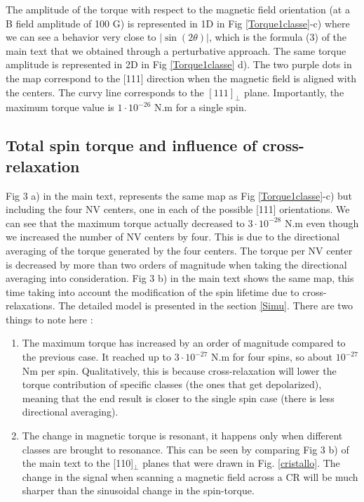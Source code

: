 \documentclass[preprintnumbers,amsmath,amssymb,onecolumn,12pt]{revtex4}
\begin{document}
The amplitude of the torque with respect to the magnetic field orientation (at a B field amplitude of 100 G) is represented in 1D in Fig \ref{Torque1classe}-c) where we can see a behavior very close to $|\sin(2\theta)|$, which is the formula (3) of the main text that we obtained through a perturbative approach. The same torque amplitude is represented in 2D in Fig \ref{Torque1classe} d). The two purple dots in the map correspond to the [111] direction when the magnetic field is aligned with the centers. The curvy line corresponds to the $[111]_\perp$ plane. Importantly, the maximum torque value is $1\cdot 10^{-26}$ N.m for a single spin.

\subsection{Total spin torque and influence of cross-relaxation}


Fig 3 a) in the main text, represents the same map as Fig \ref{Torque1classe}-c) but including the four NV centers, one in each of the possible [111] orientations. We can see that the maximum torque actually decreased to $3\cdot 10^{-28}$ N.m even though we increased the number of NV centers by four. This is due to the directional averaging of the torque generated by the four centers. The torque per NV center is decreased by more than two orders of magnitude when taking the directional averaging into consideration.
Fig 3 b) in the main text shows the same map, this time taking into account the modification of the spin lifetime due to cross-relaxations. The detailed model is presented in the section \ref{Simu}.
There are two things to note here : 
\begin{enumerate}
\item The maximum torque has increased by an order of magnitude compared to the previous case. It reached up to $3\cdot 10^{-27}$ N.m for four spins, so about $10^{-27}$ Nm per spin. Qualitatively, this is because cross-relaxation will lower the torque contribution of specific classes (the ones that get depolarized), meaning that the end result is closer to the single spin case (there is less directional averaging).
\item The change in magnetic torque is resonant, it happens only when different classes are brought to resonance. This can be seen by comparing Fig 3 b) of the main text to the [110]$_\perp$ planes that were drawn in Fig. \ref{cristallo}. The change in the signal when scanning a magnetic field across a CR will be much sharper than the sinusoidal change in the spin-torque.
\end{enumerate} 
\end{document}
